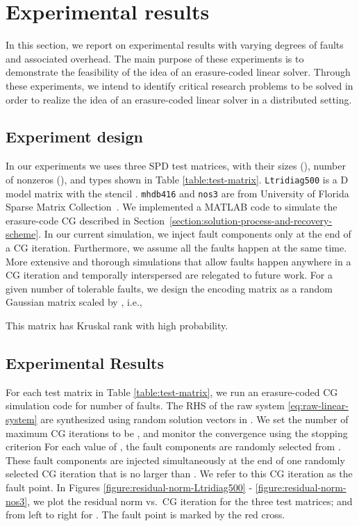 \documentclass[11pt]{article}
\begin{document}
\section{Experimental results} \label{sec:experiments}

In this section, we report on experimental results with varying degrees of faults
and associated overhead. The main purpose of these experiments is to demonstrate the
feasibility of the idea of an erasure-coded linear solver. Through these experiments,
we intend to identify critical research problems to be solved in order to realize
the idea of an erasure-coded linear solver in a distributed setting.

\subsection{Experiment design}

In our experiments we uses three SPD test matrices, with their sizes (), number of nonzeros (), and types shown in Table \ref{table:test-matrix}. {\tt Ltridiag500} is a  D model matrix with the stencil . {\tt mhdb416} and {\tt nos3} are from University of Florida Sparse Matrix Collection~\cite{DavisH:2011}.
We implemented a MATLAB code to simulate the erasure-code CG described in Section~\ref{section:solution-process-and-recovery-scheme}. In our current simulation, we inject fault components only at the end of a CG iteration. Furthermore, we assume all the faults happen at the same time. More extensive and thorough simulations that allow faults happen anywhere in a CG iteration and temporally interspersed are relegated to future work. For a given  number of tolerable faults, we design the  encoding matrix  as a random Gaussian matrix scaled by , i.e.,

This matrix has Kruskal rank  with high probability.


\subsection{Experimental Results}

For each test matrix in Table \ref{table:test-matrix}, we run an erasure-coded CG simulation code for  number of faults. The RHS  of the raw system \eqref{eq:raw-linear-system} are synthesized using random solution vectors  in . We set the number of maximum CG iterations to be , and monitor the convergence using the stopping criterion  For each value of , the  fault components are randomly selected from . These fault components are injected simultaneously at the end of one randomly selected CG iteration that is no larger than . We refer to this CG iteration as the fault point. In Figures \ref{figure:residual-norm-Ltridiag500} - \ref{figure:residual-norm-nos3}, we plot the residual norm vs.~CG iteration for the three test matrices; and from left to right for . The fault point is marked by the red cross.
\end{document}
